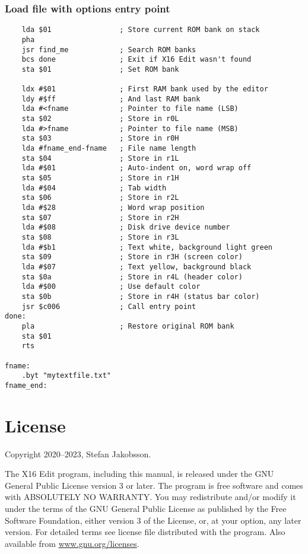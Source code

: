 \documentclass{article}
\begin{document}
    \subsubsection{Load file with options entry point}
\begin{verbatim}
    lda $01                ; Store current ROM bank on stack
    pha
    jsr find_me            ; Search ROM banks
    bcs done               ; Exit if X16 Edit wasn't found
    sta $01                ; Set ROM bank
    
    ldx #$01               ; First RAM bank used by the editor
    ldy #$ff               ; And last RAM bank
    lda #<fname            ; Pointer to file name (LSB)
    sta $02                ; Store in r0L
    lda #>fname            ; Pointer to file name (MSB)
    sta $03                ; Store in r0H
    lda #fname_end-fname   ; File name length
    sta $04                ; Store in r1L
    lda #$01               ; Auto-indent on, word wrap off
    sta $05                ; Store in r1H
    lda #$04               ; Tab width
    sta $06                ; Store in r2L
    lda #$28               ; Word wrap position
    sta $07                ; Store in r2H
    lda #$08               ; Disk drive device number
    sta $08                ; Store in r3L
    lda #$b1               ; Text white, background light green
    sta $09                ; Store in r3H (screen color)
    lda #$07               ; Text yellow, background black
    sta $0a                ; Store in r4L (header color)
    lda #$00               ; Use default color
    sta $0b                ; Store in r4H (status bar color)
    jsr $c006              ; Call entry point
done:
    pla                    ; Restore original ROM bank
    sta $01
    rts
   
fname:
    .byt "mytextfile.txt"
fname_end:
\end{verbatim}

\section{License}
	Copyright 2020--2023, Stefan Jakobsson.

	The X16 Edit program, including this manual, is released under the GNU General Public License version 3 or later.
    The program is free software and comes with ABSOLUTELY NO WARRANTY. You may redistribute and/or modify it under the 
    terms of the GNU General Public License as pub­lished by the Free Software Foundation, either version 3 of the License, 
    or, at your option, any later version. For detailed terms see license file distributed with the program. 
    Also available from \href{https://www.gnu.org/licenses}{www.gnu.org/licenses}.
\end{document}
